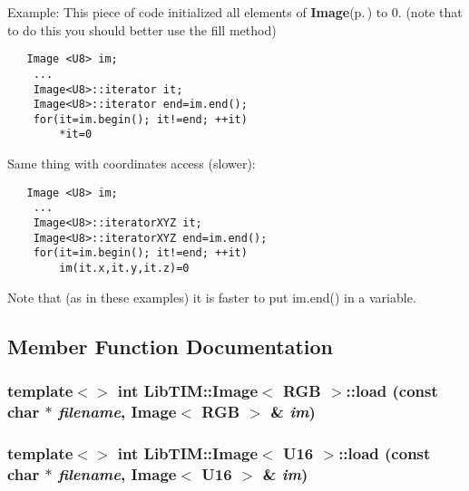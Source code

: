 \begin{Desc}
\item[Example:]This piece of code initialized all elements of {\bf Image}{\rm (p.\,\pageref{classLibTIM_1_1Image})} to 0. (note that to do this you should better use the fill method) 

\footnotesize\begin{verbatim}	Image <U8> im;
	...
	Image<U8>::iterator it;
	Image<U8>::iterator end=im.end();
	for(it=im.begin(); it!=end; ++it)
		*it=0
	\end{verbatim}
\normalsize
\end{Desc}
Same thing with coordinates access (slower):



\footnotesize\begin{verbatim}	Image <U8> im;
	...
	Image<U8>::iteratorXYZ it;
	Image<U8>::iteratorXYZ end=im.end();
	for(it=im.begin(); it!=end; ++it)
		im(it.x,it.y,it.z)=0
	\end{verbatim}
\normalsize


Note that (as in these examples) it is faster to put im.end() in a variable.



\subsection{Member Function Documentation}
\subsubsection{\setlength{\rightskip}{0pt plus 5cm}template$<$$>$ int {\bf Lib\-TIM::Image}$<$ {\bf RGB} $>$::load (const char $\ast$ {\em filename}, {\bf Image}$<$ {\bf RGB} $>$ \& {\em im})\hspace{0.3cm}{\tt  [inline]}}\label{classLibTIM_1_1Image_a63}


\subsubsection{\setlength{\rightskip}{0pt plus 5cm}template$<$$>$ int {\bf Lib\-TIM::Image}$<$ {\bf U16} $>$::load (const char $\ast$ {\em filename}, {\bf Image}$<$ {\bf U16} $>$ \& {\em im})\hspace{0.3cm}{\tt  [inline]}}\label{classLibTIM_1_1Image_a62}


